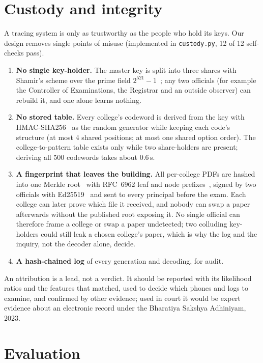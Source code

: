 \documentclass[10pt,a4paper]{article}
\theoremstyle{remark}
\begin{document}
\section{Custody and integrity}
\label{sec:custody}

A tracing system is only as trustworthy as the people who hold its keys. Our design removes single points of misuse (implemented in \texttt{custody.py}, 12 of 12 self-checks pass).
\begin{enumerate}[label=(\alph*)]
\item \textbf{No single key-holder.} The master key is split into three shares with Shamir's scheme over the prime field $2^{521}-1$~\citep{shamir1979}; any two officials (for example the Controller of Examinations, the Registrar and an outside observer) can rebuild it, and one alone learns nothing.
\item \textbf{No stored table.} Every college's codeword is derived from the key with HMAC-SHA256~\citep{rfc2104} as the random generator while keeping each code's structure (at most 4 shared positions; at most one shared option order). The college-to-pattern table exists only while two share-holders are present; deriving all 500 codewords takes about 0.6\,s.
\item \textbf{A fingerprint that leaves the building.} All per-college PDFs are hashed into one Merkle root~\citep{merkle1987} with RFC~6962 leaf and node prefixes~\citep{rfc6962}, signed by two officials with Ed25519~\citep{bernstein2012} and sent to every principal before the exam. Each college can later prove which file it received, and nobody can swap a paper afterwards without the published root exposing it. No single official can therefore frame a college or swap a paper undetected; two colluding key-holders could still leak a chosen college's paper, which is why the log and the inquiry, not the decoder alone, decide.
\item \textbf{A hash-chained log} of every generation and decoding, for audit.
\end{enumerate}
An attribution is a lead, not a verdict. It should be reported with its likelihood ratios and the features that matched, used to decide which phones and logs to examine, and confirmed by other evidence; used in court it would be expert evidence about an electronic record under the Bharatiya Sakshya Adhiniyam, 2023.

\section{Evaluation}
\label{sec:eval}
\end{document}
